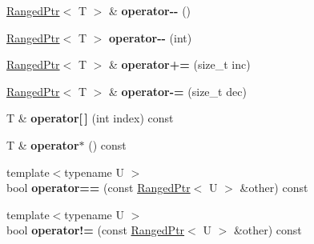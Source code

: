\begin{DoxyCompactItemize}
\item 
\hypertarget{classmozilla_1_1_ranged_ptr_a40e3c07113395a2385d0b08b1c571a68}{\hyperlink{classmozilla_1_1_ranged_ptr}{Ranged\-Ptr}$<$ T $>$ \& {\bfseries operator-\/-\/} ()}\label{classmozilla_1_1_ranged_ptr_a40e3c07113395a2385d0b08b1c571a68}

\item 
\hypertarget{classmozilla_1_1_ranged_ptr_af2e4b85d1e0b7e90d26caf767822f7b4}{\hyperlink{classmozilla_1_1_ranged_ptr}{Ranged\-Ptr}$<$ T $>$ {\bfseries operator-\/-\/} (int)}\label{classmozilla_1_1_ranged_ptr_af2e4b85d1e0b7e90d26caf767822f7b4}

\item 
\hypertarget{classmozilla_1_1_ranged_ptr_a8c2149fea81128e98e7ff4ee79419241}{\hyperlink{classmozilla_1_1_ranged_ptr}{Ranged\-Ptr}$<$ T $>$ \& {\bfseries operator+=} (size\-\_\-t inc)}\label{classmozilla_1_1_ranged_ptr_a8c2149fea81128e98e7ff4ee79419241}

\item 
\hypertarget{classmozilla_1_1_ranged_ptr_a1b233d7b734d5a18543789d0ac7f6550}{\hyperlink{classmozilla_1_1_ranged_ptr}{Ranged\-Ptr}$<$ T $>$ \& {\bfseries operator-\/=} (size\-\_\-t dec)}\label{classmozilla_1_1_ranged_ptr_a1b233d7b734d5a18543789d0ac7f6550}

\item 
\hypertarget{classmozilla_1_1_ranged_ptr_add1c9d7eceb7c06b32e0abcee1dc12a2}{T \& {\bfseries operator\mbox{[}$\,$\mbox{]}} (int index) const }\label{classmozilla_1_1_ranged_ptr_add1c9d7eceb7c06b32e0abcee1dc12a2}

\item 
\hypertarget{classmozilla_1_1_ranged_ptr_a484d6a1805b0d5d4b14c8eb11ab5b8fb}{T \& {\bfseries operator$\ast$} () const }\label{classmozilla_1_1_ranged_ptr_a484d6a1805b0d5d4b14c8eb11ab5b8fb}

\item 
\hypertarget{classmozilla_1_1_ranged_ptr_ab87971f26ae1f40178ab279a01532fce}{{\footnotesize template$<$typename U $>$ }\\bool {\bfseries operator==} (const \hyperlink{classmozilla_1_1_ranged_ptr}{Ranged\-Ptr}$<$ U $>$ \&other) const }\label{classmozilla_1_1_ranged_ptr_ab87971f26ae1f40178ab279a01532fce}

\item 
\hypertarget{classmozilla_1_1_ranged_ptr_a3ff2157a3bd687685ff3b3b35ef351ce}{{\footnotesize template$<$typename U $>$ }\\bool {\bfseries operator!=} (const \hyperlink{classmozilla_1_1_ranged_ptr}{Ranged\-Ptr}$<$ U $>$ \&other) const }\label{classmozilla_1_1_ranged_ptr_a3ff2157a3bd687685ff3b3b35ef351ce}


\end{DoxyCompactItemize}
